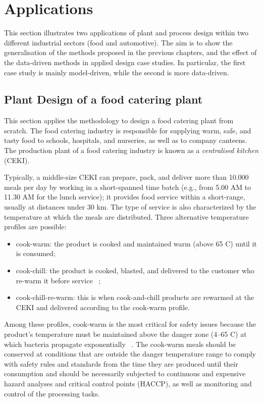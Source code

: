 \section{Applications}
This section illustrates two applications of plant and process design within two different industrial sectors (food and automotive). The aim is to show the generalisation of the methods proposed in the previous chapters, and the effect of the data-driven methods in applied design case studies. In particular, the first case study is mainly model-driven, while the second is more data-driven.

\subsection{Plant Design of a food catering plant}

This section applies the methodology to design a food catering plant from scratch. The food catering industry is responsible for supplying warm, safe, and tasty food to schools, hospitals, and nurseries, as well as to company canteens. The production plant of a food catering industry is known as a \textit{centralised kitchen} (CEKI).\par

Typically, a middle-size CEKI can prepare, pack, and deliver more than 10.000 meals per day by working in a short-spanned time batch (e.g., from 5.00 AM to 11.30 AM for the lunch service); it provides food service within a short-range, usually at distances under 30 km. The type of service is also characterized by the temperature at which the meals are distributed. Three alternative temperature profiles are possible:  

\begin{itemize}
    \item cook-warm: the product is cooked and maintained warm (above 65 \degree C) until it is consumed; 
    \item cook-chill: the product is cooked, blasted, and delivered to the customer who re-warm it before service ~\cite{Williams1996};
    \item cook-chill-re-warm: this is when cook-and-chill products are rewarmed at the CEKI and delivered according to the cook-warm profile.
\end{itemize}

Among these profiles, cook-warm is the most critical for safety issues because the product’s temperature must be maintained above the danger zone (4–65 \degree C) at which bacteria propagate exponentially ~\cite{Rahman2002}. The cook-warm meals should be conserved at conditions that are outside the danger temperature range to comply with safety rules and standards from the time they are produced until their consumption and should be necessarily subjected to continuous and expensive hazard analyses and critical control points (HACCP), as well as monitoring and control of the processing tasks. \par

